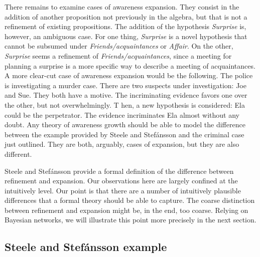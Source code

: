 \documentclass[
  11pt,
  dvipsnames,enabledeprecatedfontcommands]{scrartcl}
\begin{document}
There remains to examine cases of awareness expansion. They consist in
the addition of another proposition not previously in the algebra, but
that is not a refinement of existing propositions. The addition of the
hypothesis \textit{Surprise} is, however, an ambiguous case. For one
thing, \textit{Surprise} is a novel hypothesis that cannot be subsumed
under \textit{Friends/acquaintances} or \textit{Affair}. On the other,
\textit{Surprise} seems a refinement of \textit{Friends/acquaintances},
since a meeting for planning a surprise is a more specific way to
describe a meeting of acquaintances. A more clear-cut case of awareness
expansion would be the following. The police is investigating a murder
case. There are two suspects under investigation: Joe and Sue. They both
have a motive. The incriminating evidence favors one over the other, but
not overwhelmingly. T hen, a new hypothesis is considered: Ela could be
the perpetrator. The evidence incriminates Ela almost without any doubt.
Any theory of awareness growth should be able to model the difference
between the example provided by Steele and Stefánsson and the criminal
case just outlined. They are both, arguably, cases of expansion, but
they are also different.

Steele and Stefánsson provide a formal definition of the difference
between refinement and expansion. Our observations here are largely
confined at the intuitively level. Our point is that there are a number
of intuitively plausible differences that a formal theory should be able
to capture. The coarse distinction between refinement and expansion
might be, in the end, too coarse. Relying on Bayesian networks, we will
illustrate this point more precisely in the next section.

\hypertarget{steele-and-stefuxe1nsson-example}{%
\subsection{Steele and Stefánsson
example}\label{steele-and-stefuxe1nsson-example}}
\end{document}
